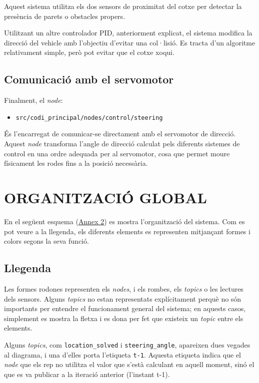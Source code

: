 \documentclass[11pt,a4paper]{article}
\let\origsection\section
\renewcommand{\section}{\clearpage\origsection}
\begin{document}
Aquest sistema utilitza els dos sensors de proximitat del cotxe per detectar la presència de parets o obstacles propers.

Utilitzant un altre controlador PID, anteriorment explicat, el sistema modifica la direcció del vehicle amb l'objectiu d'evitar una col·lisió. Es tracta d'un algoritme relativament simple, però pot evitar que el cotxe xoqui.

\subsection{Comunicació amb el servomotor}

Finalment, el \emph{node}:
\nopagebreak

\begin{itemize}
  \item \texttt{src/\allowbreak{}codi\_\allowbreak{}principal/\allowbreak{}nodes/\allowbreak{}control/\allowbreak{}steering}
\end{itemize}

És l'encarregat de comunicar-se directament amb el servomotor de direcció. Aquest \emph{node} transforma l'angle de direcció calculat pels diferents sistemes de control en una ordre adequada per al servomotor, cosa que permet moure físicament les rodes fins a la posició necessària.

\section{ORGANITZACIÓ GLOBAL}\label{sec:organitzacio-global}

En el següent esquema (\hyperref[annex-2]{Annex 2}) es mostra l’organització del sistema. Com es pot veure a la llegenda, els diferents elements es representen mitjançant formes i colors segons la seva funció.

\subsection{Llegenda}

Les formes rodones representen els \emph{nodes}, i els rombes, els \emph{topics} o les lectures dels sensors. Alguns \emph{topics} no estan representats explícitament perquè no són importants per entendre el funcionament general del sistema; en aquests casos, simplement es mostra la fletxa i es dona per fet que existeix un \emph{topic} entre els elements.

Alguns \emph{topics}, com \texttt{location\_\allowbreak{}solved} i \texttt{steering\_\allowbreak{}angle}, apareixen dues vegades al diagrama, i una d’elles porta l’etiqueta \texttt{t-1}. Aquesta etiqueta indica que el \emph{node} que els rep no utilitza el valor que s’està calculant en aquell moment, sinó el que es va publicar a la iteració anterior (l’instant t-1).
\end{document}
